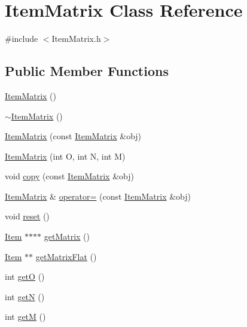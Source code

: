 \hypertarget{classItemMatrix}{\section{Item\-Matrix Class Reference}
\label{classItemMatrix}
}


{\ttfamily \#include $<$Item\-Matrix.\-h$>$}

\subsection*{Public Member Functions}
\begin{DoxyCompactItemize}
\item 
\hyperlink{classItemMatrix_a68ef432c2980e7c1ce8b683b2ae5c0ab}{Item\-Matrix} ()
\item 
\hyperlink{classItemMatrix_afea08e73553deb9a380f991db13dfb8a}{$\sim$\-Item\-Matrix} ()
\item 
\hyperlink{classItemMatrix_a35f712d777c4bc293435944c57311d81}{Item\-Matrix} (const \hyperlink{classItemMatrix}{Item\-Matrix} \&obj)
\item 
\hyperlink{classItemMatrix_a34829071decf583ec414ccf41776edae}{Item\-Matrix} (int O, int N, int M)
\item 
void \hyperlink{classItemMatrix_a740f6288b3c2df24ecac8243ca7cb9c1}{copy} (const \hyperlink{classItemMatrix}{Item\-Matrix} \&obj)
\item 
\hyperlink{classItemMatrix}{Item\-Matrix} \& \hyperlink{classItemMatrix_a967e74cda2ddfabc9a2de8e01c14bafe}{operator=} (const \hyperlink{classItemMatrix}{Item\-Matrix} \&obj)
\item 
void \hyperlink{classItemMatrix_a335cf037ed4ab6a6c2ee107b17ecff44}{reset} ()
\item 
\hyperlink{classItem}{Item} $\ast$$\ast$$\ast$$\ast$ \hyperlink{classItemMatrix_a94dd13fa054a2233833783636ca9d881}{get\-Matrix} ()
\item 
\hyperlink{classItem}{Item} $\ast$$\ast$ \hyperlink{classItemMatrix_aca0985d456354567b62bb1fbbca1a3bd}{get\-Matrix\-Flat} ()
\item 
int \hyperlink{classItemMatrix_ad20ebddd51c2c597e6fb77ebadddd1a2}{get\-O} ()
\item 
int \hyperlink{classItemMatrix_a62a080689838d80ca501fe492d82a54b}{get\-N} ()
\item 
int \hyperlink{classItemMatrix_ad8f788c29401efd06e9019ff320a765b}{get\-M} ()
\end{DoxyCompactItemize}


